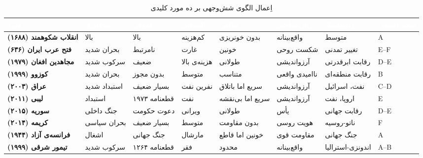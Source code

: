 \begin{landscape}
\begin{table}[htbp]
\centering
\caption{اِعمال الگوی شش‌وجهی بر ده مورد کلیدی}\label{tab:ch03-comparative}
\begin{adjustbox}{max width=\linewidth}
\begin{tabular}{
  >{\raggedleft\arraybackslash\bfseries\small}p{2cm}
  >{\raggedleft\arraybackslash\small}p{3.5cm}
  >{\raggedleft\arraybackslash\small}p{2.5cm}
  >{\raggedleft\arraybackslash\small}p{3.5cm}
  >{\raggedleft\arraybackslash\small}p{3.5cm}
  >{\raggedleft\arraybackslash\small}p{3.5cm}
  >{\raggedleft\arraybackslash\small}p{3.5cm}
  >{\raggedleft\arraybackslash\small}p{2cm}}
\toprule
\rowcolor{PrimaryDeep}
\textcolor{white}{مورد} &
\textcolor{white}{ساختاری} &
\textcolor{white}{حقوقی} &
\textcolor{white}{اقتصادی} &
\textcolor{white}{نظامی} &
\textcolor{white}{روان‌شناختی} &
\textcolor{white}{ژئوپولیتیک} &
\textcolor{white}{نتیجه (طیف)} \\
\midrule

انقلاب شکوهمند (۱۶۸۸) &
\cellcolor{AccentGreen!20}بالا &
\cellcolor{AccentGreen!20}بالا &
\cellcolor{AccentGreen!20}کم‌هزینه &
\cellcolor{AccentGreen!20}بدون خونریزی &
\cellcolor{AccentGreen!20}واقع‌بینانه &
\cellcolor{mixed mark!20}متوسط &
\cellcolor{AccentGreen!20}A \\
\rowcolor{NeutralLight}
فتح عرب ایران (۶۳۶) &
بحران شدید &
نامرتبط &
غارت &
خونین &
شکست روحی &
تغییر تمدنی &
E–F \\
مجاهدین افغان (۱۹۷۹) &
سرکوب شدید &
ضعیف &
هزینه‌ی بالا &
طولانی &
آرزواندیشی &
رقابت ابرقدرتی &
D–E \\
\rowcolor{NeutralLight}
کوزوو (۱۹۹۹) &
بحران شدید &
بدون مجوز &
متوسط &
متناسب &
ناامیدی واقعی &
رقابت منطقه‌ای &
B \\
عراق (۲۰۰۳) &
استبداد شدید &
بسیار ضعیف &
نفرین نفت &
سریع اما باتلاق &
آرزواندیشی &
نفت، اسرائیل &
C–D \\
\rowcolor{NeutralLight}
لیبی (۲۰۱۱) &
استبداد &
قطعنامه ۱۹۷۳ &
نفت &
سریع اما بی‌نقشه &
آرزواندیشی &
اروپا، نفت &
E \\
سوریه (۲۰۱۵) &
جنگ داخلی &
دعوت حکومت &
ویرانی &
طولانی &
یأس &
رقابت جهانی &
D–E \\
\rowcolor{NeutralLight}
کریمه (۲۰۱۴) &
بحران سیاسی &
بسیار ضعیف &
متوسط &
بدون مقاومت &
هویت روسی &
ناتو-روسیه &
F \\
فرانسه‌ی آزاد (۱۹۴۴) &
اشغال &
جنگ جهانی &
مارشال &
خونین اما قاطع &
مقاومت قوی &
جنگ جهانی &
A \\
\rowcolor{NeutralLight}
تیمور شرقی (۱۹۹۹) &
سرکوب شدید &
قطعنامه ۱۲۶۴ &
فقر &
محدود &
واقع‌بینانه &
اندونزی-استرالیا &
A–B \\

\bottomrule
\end{tabular}
\end{adjustbox}
\end{table}
\end{landscape}

